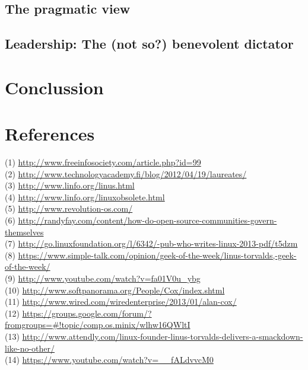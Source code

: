 \documentclass[11pt]{article}
\begin{document}
\subsection{The pragmatic view}
\subsection{Leadership: The (not so?) benevolent dictator}

\section{Conclussion}

\section{References}
(1) \url{http://www.freeinfosociety.com/article.php?id=99}
\\
(2) \url{http://www.technologyacademy.fi/blog/2012/04/19/laureates/}
\\
(3) \url{http://www.linfo.org/linus.html}
\\
(4) \url{http://www.linfo.org/linuxobsolete.html}
\\
(5) \url{http://www.revolution-os.com/}
\\
(6) \url{http://randyfay.com/content/how-do-open-source-communities-govern-themselves}
\\
(7) \url{http://go.linuxfoundation.org/l/6342/-pub-who-writes-linux-2013-pdf/t5dzm}
\\
(8) \url{https://www.simple-talk.com/opinion/geek-of-the-week/linus-torvalds,-geek-of-the-week/}
\\
(9) \url{http://www.youtube.com/watch?v=fa01V0u_ybg}
\\
(10) \url{http://www.softpanorama.org/People/Cox/index.shtml}
\\
(11) \url{http://www.wired.com/wiredenterprise/2013/01/alan-cox/}
\\
(12) \url{https://groups.google.com/forum/?fromgroups=#!topic/comp.os.minix/wlhw16QWltI}
\\
(13) \url{http://www.attendly.com/linux-founder-linus-torvalds-delivers-a-smackdown-like-no-other/}
\\
(14) \url{https://www.youtube.com/watch?v=__fALdvvcM0}
\\
\end{document}
